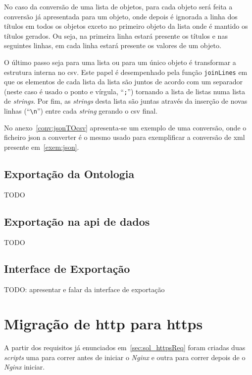 No caso da conversão de uma lista de objetos, para cada objeto será feita a conversão já apresentada para um objeto, onde depois é ignorada a linha dos títulos em todos os objetos exceto no primeiro objeto da lista onde é mantido os títulos gerados. Ou seja, na primeira linha estará presente os títulos e nas seguintes linhas, em cada linha estará presente os valores de um objeto.

O último passo seja para uma lista ou para um único objeto é transformar a estrutura interna no \acrshort{csv}. Este papel é desempenhado pela função \texttt{joinLines} em que os elementos de cada lista da lista são juntos de acordo com um separador (neste caso é usado o ponto e vírgula, ``\texttt{;}'') tornando a lista de listas numa lista de \textit{strings}. Por fim, as \textit{strings} desta lista são juntas através da inserção de novas linhas (``\texttt{\textbackslash{}n}'') entre cada \textit{string} gerando o \acrshort{csv} final.

No anexo~\ref{conv:jsonTOcsv} apresenta-se um exemplo de uma conversão, onde o ficheiro \acrshort{json} a converter é o mesmo usado para exemplificar a conversão de \acrshort{xml} presente em~\ref{exem:json}.

\subsection{Exportação da Ontologia}

TODO

\subsection{Exportação na \acrshort{api} de dados}

TODO

\subsection{Interface de Exportação}

TODO: apresentar e falar da interface de exportação

\section{Migração de \acrshort{http} para \acrshort{https}}

A partir dos requisitos já enunciados em~\ref{sec:sol_httpsReq} foram criadas duas \textit{scripts} uma para correr antes de iniciar o \textit{Nginx} e outra para correr depois de o \textit{Nginx} iniciar.

